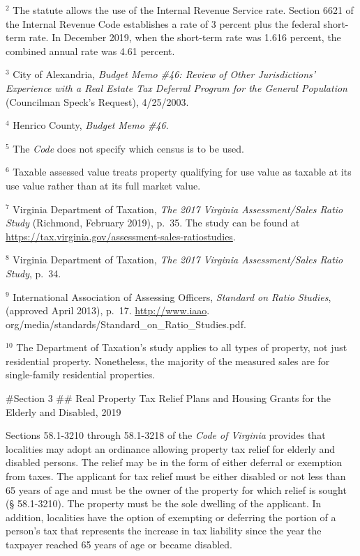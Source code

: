 \documentclass[
]{book}
\begin{document}
\(^2\) The statute allows the use of the Internal Revenue Service rate. Section 6621 of the Internal Revenue Code establishes a rate of 3 percent plus the federal short-term rate. In December 2019, when the short-term rate was 1.616 percent, the combined annual rate was 4.61 percent.

\(^3\) City of Alexandria, \emph{Budget Memo \#46: Review of Other Jurisdictions' Experience with a Real Estate Tax Deferral Program for the General Population} (Councilman Speck's Request), 4/25/2003.

\(^4\) Henrico County, \emph{Budget Memo \#46}.

\(^5\) The \emph{Code} does not specify which census is to be used.

\(^6\) Taxable assessed value treats property qualifying for use value
as taxable at its use value rather than at its full market value.

\(^7\) Virginia Department of Taxation, \emph{The 2017 Virginia Assessment/Sales Ratio Study} (Richmond, February 2019), p.~35. The study
can be found at \url{https://tax.virginia.gov/assessment-sales-ratiostudies}.

\(^8\) Virginia Department of Taxation, \emph{The 2017 Virginia Assessment/Sales Ratio Study}, p.~34.

\(^9\) International Association of Assessing Officers, \emph{Standard on Ratio Studies}, (approved April 2013), p.~17. \url{http://www.iaao}.
org/media/standards/Standard\_on\_Ratio\_Studies.pdf.

\(^10\) The Department of Taxation's study applies to all types of property, not just residential property. Nonetheless, the majority of
the measured sales are for single-family residential properties.

\#Section 3
\#\# Real Property Tax Relief Plans and Housing Grants for the Elderly and Disabled, 2019

Sections 58.1-3210 through 58.1-3218 of the \emph{Code of Virginia} provides that localities may adopt an ordinance allowing property tax relief for elderly and disabled persons. The relief may be in the form of either deferral or exemption from taxes. The applicant for tax relief must be either disabled or not less than 65 years of age and must be the owner of the property for which relief is sought (§ 58.1-3210). The property must be the sole dwelling of the applicant. In addition, localities have the option of exempting or deferring the portion of a person's tax that represents the increase in tax liability since the year the taxpayer reached 65 years of age or became disabled.
\end{document}
